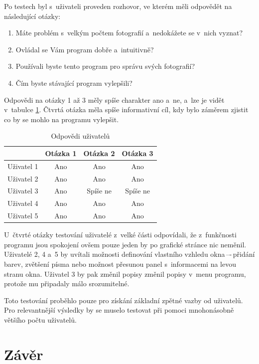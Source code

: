 Po testech byl s~uživateli proveden rozhovor, ve kterém měli odpovědět na následující otázky:

\begin{enumerate}
\item Máte problém s~velkým počtem fotografií a~nedokážete se v~nich vyznat?
\item Ovládal se Vám program dobře a~intuitivně?
\item Používali byste tento program pro správu svých fotografií?
\item Čím byste stávající program vylepšili?
\end{enumerate}

Odpovědi na otázky 1 až 3 měly spíše charakter ano a~ne, a~lze je vidět v~tabulce \ref{uz_odpov}. Čtvrtá otázka měla spíše informativní cíl, kdy bylo záměrem zjistit co by se mohlo na programu vylepšit.

\begin{table}[h]
\centering
\begin{tabular}{|c|c|c|c|}
\hline 
           & Otázka 1 & Otázka 2 & Otázka 3 \\ \hline
Uživatel 1 & Ano      & Ano      & Ano      \\ \hline
Uživatel 2 & Ano      & Ano      & Ano      \\ \hline
Uživatel 3 & Ano      & Spíše ne & Spíše ne \\ \hline
Uživatel 4 & Ano      & Ano      & Ano      \\ \hline
Uživatel 5 & Ano      & Ano      & Ano      \\ \hline
\end{tabular}
\caption{Odpovědi uživatelů}
\label{uz_odpov}
\end{table}

U~čtvrté otázky testování uživatelé z~velké části odpovídali, že z~funkčnosti programu jsou spokojení ovšem pouze jeden by po grafické stránce nic neměnil. Uživatelé 2, 4 a~5 by uvítali možnosti definování vlastního vzhledu okna\,–-\,přidání barev, zvětšení písma nebo možnost přesunou panel s~informacemi na levou stranu okna. Uživatel 3 by pak změnil popisy změnil popisy v~menu programu, protože mu připadaly málo srozumitelné.

Toto testování proběhlo pouze pro získání základní zpětné vazby od uživatelů. Pro relevantnější výsledky by se muselo testovat při pomoci mnohonásobně většího počtu uživatelů.

\chapter{Závěr}

